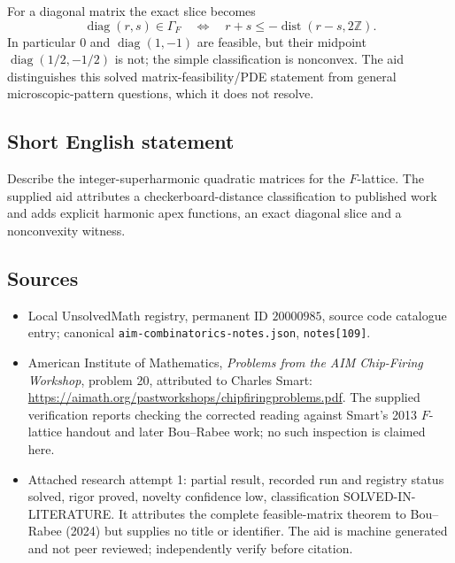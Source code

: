 \documentclass[11pt]{article}
\newcommand{\Z}{\mathbb{Z}}
\begin{document}
For a diagonal matrix the exact slice becomes
\[
\operatorname{diag}(r,s)\in\Gamma_F\quad\Longleftrightarrow\quad
r+s\le-\operatorname{dist}(r-s,2\Z).
\]
In particular $0$ and $\operatorname{diag}(1,-1)$ are feasible, but their midpoint $\operatorname{diag}(1/2,-1/2)$ is not; the simple classification is nonconvex. The aid distinguishes this solved matrix-feasibility/PDE statement from general microscopic-pattern questions, which it does not resolve.
\subsection{Short English statement}
Describe the integer-superharmonic quadratic matrices for the $F$-lattice. The supplied aid attributes a checkerboard-distance classification to published work and adds explicit harmonic apex functions, an exact diagonal slice and a nonconvexity witness.
\subsection{Sources}
\begin{itemize}
\item Local UnsolvedMath registry, permanent ID $20000985$, source code catalogue entry; canonical \texttt{aim-combinatorics-notes.json}, \texttt{notes[109]}.
\item American Institute of Mathematics, \emph{Problems from the AIM Chip-Firing Workshop}, problem 20, attributed to Charles Smart: \url{https://aimath.org/pastworkshops/chipfiringproblems.pdf}. The supplied verification reports checking the corrected reading against Smart's 2013 $F$-lattice handout and later Bou--Rabee work; no such inspection is claimed here.
\item Attached research attempt 1: partial result, recorded run and registry status solved, rigor proved, novelty confidence low, classification SOLVED-IN-LITERATURE. It attributes the complete feasible-matrix theorem to Bou--Rabee (2024) but supplies no title or identifier. The aid is machine generated and not peer reviewed; independently verify before citation.
\end{itemize}
\end{document}
